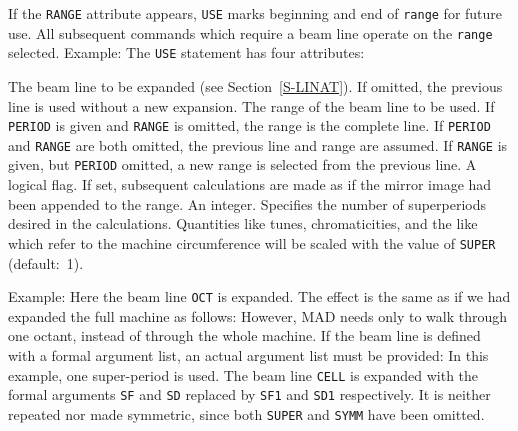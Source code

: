 If the {\tt RANGE} attribute appears,
{\tt USE} marks beginning and end of {\tt range} for future use.
All subsequent commands which require a beam line operate on the
{\tt range} selected.
Example:
The {\tt USE} statement has four attributes:
\begin{mylist}
The beam line to be expanded (see Section~\ref{S-LINAT}).
If omitted, the previous line is used without a new expansion.
The range of the beam line to be used.
If {\tt PERIOD} is given and {\tt RANGE} is omitted,
the range is the complete line.
If {\tt PERIOD} and {\tt RANGE} are both omitted,
the previous line and range are assumed.
If {\tt RANGE} is given, but {\tt PERIOD} omitted,
a new range is selected from the previous line.
A logical flag.
If set, subsequent calculations are made as if the mirror image had
been appended to the range.
An integer.
Specifies the number of superperiods desired in the calculations.
Quantities like tunes, chromaticities, and the like which refer to
the machine circumference will be scaled with the value of
{\tt SUPER} (default:~1).
\end{mylist}
Example:
Here the beam line {\tt OCT} is expanded.
The effect is the same as if we had expanded the full machine as follows:
However, MAD needs only to walk through one octant,
instead of through the whole machine.
If the beam line is defined with a formal argument list,
an actual argument list must be provided:
In this example, one super-period is used.
The beam line {\tt CELL} is expanded with the formal arguments
{\tt SF} and {\tt SD} replaced by
{\tt SF1} and {\tt SD1} respectively.
It is neither repeated nor made symmetric,
since both {\tt SUPER} and {\tt SYMM} have been omitted.

